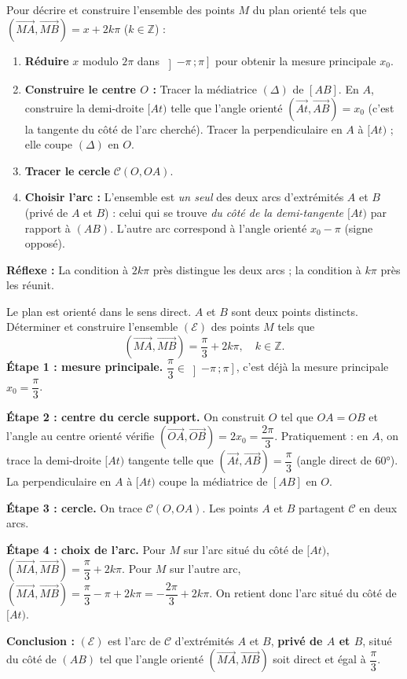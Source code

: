 \documentclass[11pt]{article}
\begin{document}
\begin{methode}
Pour décrire et construire l'ensemble des points $M$ du plan orienté tels que $(\overrightarrow{MA},\overrightarrow{MB})=x+2k\pi$ ($k\in\mathbb{Z}$) :
\begin{enumerate}
\item \textbf{Réduire} $x$ modulo $2\pi$ dans $\left]-\pi\,;\pi\right]$ pour obtenir la mesure principale $x_0$.
\item \textbf{Construire le centre $O$ :} Tracer la médiatrice $(\Delta)$ de $[AB]$. En $A$, construire la demi-droite $[At)$ telle que l'angle orienté $(\overrightarrow{At},\overrightarrow{AB}) = x_0$ (c'est la tangente du côté de l'arc cherché). Tracer la perpendiculaire en $A$ à $[At)$ ; elle coupe $(\Delta)$ en $O$.
\item \textbf{Tracer le cercle} $\mathcal{C}(O,OA)$.
\item \textbf{Choisir l'arc :} L'ensemble est \emph{un seul} des deux arcs d'extrémités $A$ et $B$ (privé de $A$ et $B$) : celui qui se trouve \emph{du côté de la demi-tangente $[At)$} par rapport à $(AB)$. L'autre arc correspond à l'angle orienté $x_0-\pi$ (signe opposé).
\end{enumerate}
\textbf{Réflexe :} La condition à $2k\pi$ près distingue les deux arcs ; la condition à $k\pi$ près les réunit.
\end{methode}

\begin{exoresolu}
Le plan est orienté dans le sens direct. $A$ et $B$ sont deux points distincts. Déterminer et construire l'ensemble $(\mathcal{E})$ des points $M$ tels que
\[
(\overrightarrow{MA},\overrightarrow{MB})=\frac{\pi}{3}+2k\pi,\quad k\in\mathbb{Z}.
\]
\tcblower
\textbf{Étape 1 : mesure principale.} $\dfrac{\pi}{3}\in\left]-\pi\,;\pi\right]$, c'est déjà la mesure principale $x_0 = \dfrac{\pi}{3}$.

\textbf{Étape 2 : centre du cercle support.} On construit $O$ tel que $OA=OB$ et l'angle au centre orienté vérifie $(\overrightarrow{OA},\overrightarrow{OB})=2x_0 = \dfrac{2\pi}{3}$.
Pratiquement : en $A$, on trace la demi-droite $[At)$ tangente telle que $(\overrightarrow{At},\overrightarrow{AB}) = \dfrac{\pi}{3}$ (angle direct de $60°$). La perpendiculaire en $A$ à $[At)$ coupe la médiatrice de $[AB]$ en $O$.

\textbf{Étape 3 : cercle.} On trace $\mathcal{C}(O,OA)$. Les points $A$ et $B$ partagent $\mathcal{C}$ en deux arcs.

\textbf{Étape 4 : choix de l'arc.} Pour $M$ sur l'arc situé du côté de $[At)$, $(\overrightarrow{MA},\overrightarrow{MB})=\dfrac{\pi}{3}+2k\pi$. Pour $M$ sur l'autre arc, $(\overrightarrow{MA},\overrightarrow{MB})=\dfrac{\pi}{3}-\pi+2k\pi=-\dfrac{2\pi}{3}+2k\pi$. On retient donc l'arc situé du côté de $[At)$.

\textbf{Conclusion :} $(\mathcal{E})$ est l'arc de $\mathcal{C}$ d'extrémités $A$ et $B$, \textbf{privé de $A$ et $B$}, situé du côté de $(AB)$ tel que l'angle orienté $(\overrightarrow{MA},\overrightarrow{MB})$ soit direct et égal à $\dfrac{\pi}{3}$.
\end{exoresolu}
\end{document}
